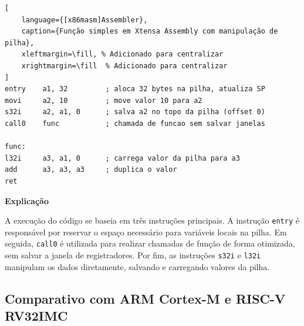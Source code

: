 \documentclass[12pt, letterpaper, twoside]{article}
\begin{document}
\begin{lstlisting}[
    language={[x86masm]Assembler},
    caption={Função simples em Xtensa Assembly com manipulação de pilha},
    xleftmargin=\fill, % Adicionado para centralizar
    xrightmargin=\fill  % Adicionado para centralizar
]
entry    a1, 32         ; aloca 32 bytes na pilha, atualiza SP
movi     a2, 10         ; move valor 10 para a2
s32i     a2, a1, 0      ; salva a2 no topo da pilha (offset 0)
call0    func           ; chamada de funcao sem salvar janelas

func:
l32i     a3, a1, 0      ; carrega valor da pilha para a3
add      a3, a3, a3     ; duplica o valor
ret
\end{lstlisting}

\textbf{Explicação}

A execução do código se baseia em três instruções principais. A instrução \texttt{entry} é responsável por reservar o espaço necessário para variáveis locais na pilha. Em seguida, \texttt{call0} é utilizada para realizar chamadas de função de forma otimizada, sem salvar a janela de registradores. Por fim, as instruções \texttt{s32i} e \texttt{l32i} manipulam os dados diretamente, salvando e carregando valores da pilha.

\subsection{Comparativo com ARM Cortex-M e RISC-V RV32IMC}
\end{document}
